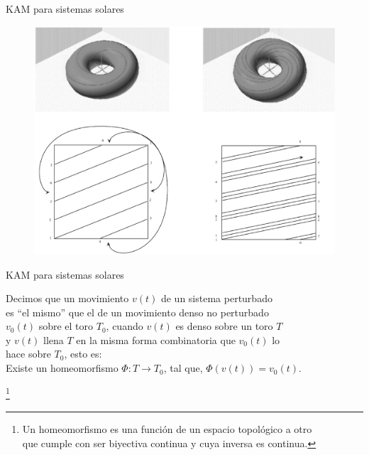 \documentclass[8pt]{beamer}
\renewcommand{\>}{\rangle}
\newcommand{\<}{\langle}
\begin{document}
\begin{frame}{KAM para sistemas solares}

\begin{figure}[h]
\centering
\includegraphics[scale=0.2]{comb.eps}
\end{figure}

\end{frame}

\begin{frame}{KAM para sistemas solares}

\begin{mygreenbox}{}
\centering
Decimos que un movimiento $v(t)$ de un sistema perturbado\\[5pt] es ``el mismo'' que el de un movimiento denso no perturbado\\[5pt] $v_{0}(t)$ sobre el toro $T_{0}$, cuando $v(t)$ es denso sobre un toro $T$\\[5pt] \hspace{-0.3cm} y $v(t)$ llena $T$ en la misma forma combinatoria que $v_{0}(t)$ lo\\[5pt] \hspace{-4.7cm} hace sobre $T_{0}$, esto es: \\[5pt]
Existe un homeomorfismo $\Phi:T \rightarrow T_{0}$, tal que, $\Phi(v(t)) = v_{0}(t)$.
\end{mygreenbox}

\footnote{Un homeomorfismo es una función de un espacio topológico a otro\\ que cumple con ser biyectiva continua y cuya inversa es continua.} 
\end{frame}
\end{document}
